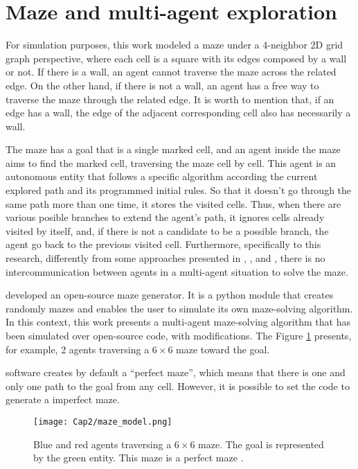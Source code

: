 \section{Maze and multi-agent exploration}
\label{section_models_maze}
For simulation purposes, this work modeled a maze under a 4-neighbor 2D grid graph perspective, where each cell is a square with its edges composed by a wall or not. If there is a wall, an agent cannot traverse the maze across the related edge. On the other hand, if there is not a wall, an agent has a free way to traverse the maze through the related edge. It is worth to mention that, if an edge has a wall, the edge of the adjacent corresponding cell also has necessarily a wall.

The maze has a goal that is a single marked cell, and an agent inside the maze aims to find the marked cell, traversing the maze cell by cell. This agent is an autonomous entity that follows a specific algorithm according the current explored path and its programmed initial rules. So that it doesn't go through the same path more than one time, it stores the visited cells. Thus, when there are various posible branches to extend the agent's path, it ignores cells already visited by itself, and, if there is not a candidate to be a possible branch, the agent go back to the previous visited cell. Furthermore, specifically to this research, differently from some approaches presented in , , and , there is no intercommunication between agents in a multi-agent situation to solve the maze.

 developed an open-source maze generator. It is a python module that creates randomly mazes and enables the user to simulate its own maze-solving algorithm. In this context, this work presents a multi-agent maze-solving algorithm that has been simulated over  open-source code, with modifications. The Figure \ref{maze_model} presents, for example, 2 agents traversing a $6 \times 6$ maze toward the goal.

 software creates by default a ``perfect maze'', which means that there is one and only one path to the goal from any cell. However, it is possible to set the code to generate a imperfect maze.

\begin{figure}[ht!]
\centering
\texttt{[image: Cap2/maze\_model.png]}
\caption{Blue and red agents traversing a $6\times 6$ maze. The goal is represented by the green entity. This maze is a perfect maze \cite{Muhammad2021}.}
\label{maze_model}
\end{figure}

